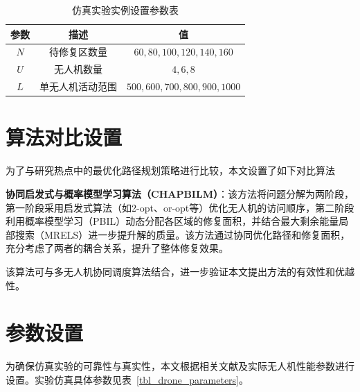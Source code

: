 \documentclass[AutoFakeBold]{LZUThesis}
\begin{document}
\begin{table}[htbp]
	\centering
	\caption{仿真实验实例设置参数表}
	\setlength{\tabcolsep}{18pt}
	\begin{tabular}{ccc}
		\toprule
		参数  & 描述       & 值                               \\
		\midrule
		$N$ & 待修复区数量   & $60, 80, 100, 120, 140, 160$    \\
		$U$ & 无人机数量    & $4, 6, 8$                       \\
		$L$ & 单无人机活动范围 & $500, 600, 700, 800, 900, 1000$ \\
		\bottomrule
	\end{tabular}
	\label{tbl_instance_setting}
\end{table}

\section{算法对比设置}

为了与研究热点中的最优化路径规划策略\cite{aggarwal2020path}进行比较，本文设置了如下对比算法

\textbf{协同启发式与概率模型学习算法（CHAPBILM）\cite{JIAO2024108084}}：该方法将问题分解为两阶段，第一阶段采用启发式算法（如2-opt、or-opt等）优化无人机的访问顺序，第二阶段利用概率模型学习（PBIL）动态分配各区域的修复面积，并结合最大剩余能量局部搜索（MRELS）进一步提升解的质量。该方法通过协同优化路径和修复面积，充分考虑了两者的耦合关系，提升了整体修复效果。

该算法可与多无人机协同调度算法结合，进一步验证本文提出方法的有效性和优越性。

\section{参数设置}
为确保仿真实验的可靠性与真实性，本文根据相关文献及实际无人机性能参数进行设置。实验仿真具体参数见表~\ref{tbl_drone_parameters}。
\end{document}
